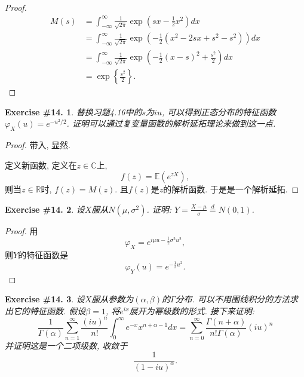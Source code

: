 \documentclass[UTF8, a4paper]{article}
\newtheorem{exercise}{Exercise \#14.}
\begin{document}
\begin{proof}
$$
\begin{aligned}
    M(s) &= \int_{-\infty}^{\infty} \frac{1}{\sqrt{2 \pi}} \exp \left(s x-\frac{1}{2} x^2\right) d x \\
    &= \int_{-\infty}^{\infty} \frac{1}{\sqrt{2 \pi}} \exp \left(-\frac{1}{2} (x^2 - 2sx + s^2 - s^2)\right) d x \\
    &= \int_{-\infty}^{\infty} \frac{1}{\sqrt{2 \pi}} \exp \left(-\frac{1}{2} (x - s)^2 + \frac{s^2}{2}\right) d x \\
    &= \exp\left\{\frac{s^2}{2}\right\}.
\end{aligned}
$$
\end{proof}



\begin{framed}
\begin{exercise}
替换习题4.16中的\(s\)为\(iu\), 可以得到正态分布的特征函数\(\varphi_X(u) = e^{-u^2/2}\).
证明可以通过复变量函数的解析延拓理论来做到这一点.
\end{exercise}
\end{framed}

\begin{proof}
带入, 显然. 

定义新函数, 定义在\(z\in \mathbb{C}\)上, 
$$
f(z) = \mathbb{E}(e^{zX}), 
$$
则当\(z \in \mathbb{R}\)时, \(f(z) = M(z)\).
且\(f(z)\)是\(z\)的解析函数. 于是是一个解析延拓.
\end{proof}


\begin{framed}
\begin{exercise}
设\(X\)服从\(N(\mu, \sigma^2)\). 证明: \(Y = \frac{X - \mu}{\sigma} \overset{d}{=} N(0, 1)\).
\end{exercise}
\end{framed}

\begin{proof}
用
$$
\varphi_X = e^{i\mu u - \frac{1}{2}\sigma^2 u^2},
$$
则\(Y\)的特征函数是
$$
\varphi_Y(u) = e^{-\frac{1}{2}u^2}.
$$
\end{proof}


\begin{framed}
\begin{exercise}
设\(X\)服从参数为\((\alpha, \beta)\)的\(\Gamma\)分布. 可以不用围线积分的方法求出它的特征函数. 假设\(\beta = 1\), 将\(e^{ix}\)展开为幂级数的形式. 接下来证明:
$$
\frac{1}{\Gamma(\alpha)} \sum_{n=1}^{\infty} \frac{(i u)^n}{n!} \int_0^{\infty} e^{-x} x^{n+\alpha-1} d x=\sum_{n=0}^{\infty} \frac{\Gamma(n+\alpha)}{n!\Gamma(\alpha)}(i u)^n
$$
并证明这是一个二项级数, 收敛于
$$
\frac{1}{(1-i u)^\alpha} .
$$
\end{exercise}
\end{framed}
\end{document}
